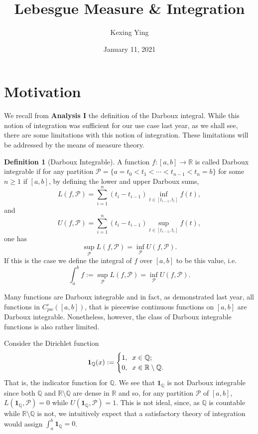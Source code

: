 \documentclass[
]{article}
\title{Lebesgue Measure \& Integration}
\author{Kexing Ying}
\date{January 11, 2021}
\theoremstyle{definition}
\theoremstyle{definition}
\newtheorem{definition}{Definition}[section]
\begin{document}
\maketitle

{
\hypersetup{linkcolor=}
\setcounter{tocdepth}{2}
\tableofcontents
}
\newpage

\hypertarget{motivation}{%
\section{Motivation}\label{motivation}}

We recall from \textbf{Analysis I} the definition of the Darboux
integral. While this notion of integration was sufficient for our use
case last year, as we shall see, there are some limitations with this
notion of integration. These limitations will be addressed by the means
of measure theory.

\begin{definition}[Darboux Integrable]
  A function \(f : [a, b] \to \mathbb{R}\) is called Darboux integrable if for 
  any partition \(\mathcal{P} = \{a = t_0 < t_1 < \cdots < t_{n - 1} < t_n = b \}\)
  for some \(n \ge 1\) if \([a, b]\), by defining the lower and upper Darboux sums, 
  \[L(f, \mathcal{P}) = \sum_{i = 1}^n (t_i - t_{i - 1}) \inf_{t \in [t_{i-1}, t_i]} f(t),\]
  and
  \[U(f, \mathcal{P}) = \sum_{i = 1}^n (t_i - t_{i - 1}) \sup_{t \in [t_{i-1}, t_i]} f(t),\]
  one has 
  \[\sup_{\mathcal{P}} L(f, \mathcal{P}) = \inf_{\mathcal{P}} U(f, \mathcal{P}).\]
  If this is the case we define the integral of \(f\) over \([a, b]\) to be this 
  value, i.e. 
  \[\int_a^b f := \sup_{\mathcal{P}} L(f, \mathcal{P}) = \inf_{\mathcal{P}} U(f, \mathcal{P}).\]
\end{definition}

Many functions are Darboux integrable and in fact, as demonstrated last
year, all functions in \(C_{pw}^\circ([a, b])\), that is piecewise
continuous functions on \([a, b]\) are Darboux integrable. Nonetheless,
however, the class of Darboux integrable functions is also rather
limited.

Consider the Dirichlet function \[\mathbf{1}_{\mathbb{Q}}(x) := 
  \begin{cases}
    1, \hspace{2mm} x \in \mathbb{Q};\\
    0, \hspace{2mm} x \in \mathbb{R}\setminus\mathbb{Q}.
  \end{cases}\] That is, the indicator function for \(\mathbb{Q}\). We
see that \(\mathbf{1}_\mathbb{Q}\) is not Darboux integrable since both
\(\mathbb{Q}\) and \(\mathbb{R}\setminus\mathbb{Q}\) are dense in
\(\mathbb{R}\) and so, for any partition \(\mathcal{P}\) of \([a, b]\),
\(L(\mathbf{1}_\mathbb{Q}, \mathcal{P}) = 0\) while
\(U(\mathbf{1}_\mathbb{Q}, \mathcal{P}) = 1\). This is not ideal, since,
as \(\mathbb{Q}\) is countable while \(\mathbb{R}\setminus\mathbb{Q}\)
is not, we intuitively expect that a satisfactory theory of integration
would assign \(\int_a^b \mathbf{1}_\mathbb{Q} = 0\).
\end{document}
